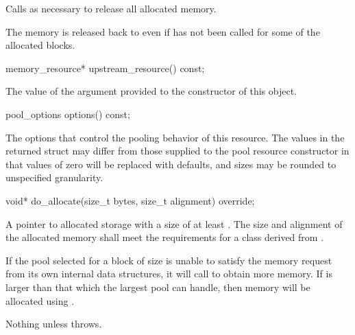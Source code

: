 \begin{itemdescr}
\pnum
\effects
Calls  as necessary
to release all allocated memory.
\begin{note}
The memory is released back to 
even if  has not been called
for some of the allocated blocks.\end{note}
\end{itemdescr}

%
%
\begin{itemdecl}
memory_resource* upstream_resource() const;
\end{itemdecl}

\begin{itemdescr}
\pnum
\returns
The value of the  argument
provided to the constructor of this object.
\end{itemdescr}

%
%
\begin{itemdecl}
pool_options options() const;
\end{itemdecl}

\begin{itemdescr}
\pnum
\returns
The options that control the pooling behavior of this resource.
The values in the returned struct may differ
from those supplied to the pool resource constructor in that
values of zero will be replaced with 
defaults, and sizes may be rounded to unspecified granularity.
\end{itemdescr}

%
%
\begin{itemdecl}
void* do_allocate(size_t bytes, size_t alignment) override;
\end{itemdecl}

\begin{itemdescr}
\pnum
\returns
A pointer to allocated storage
with a size of at least .
The size and alignment of the allocated memory shall meet the requirements
for a class derived from .

\pnum
\effects
If the pool selected for a block of size 
is unable to satisfy the memory request from its own internal data structures,
it will call  to obtain more memory.
If  is larger than that which the largest pool can handle,
then memory will be allocated using .

\pnum
\throws
Nothing unless  throws.
\end{itemdescr}

